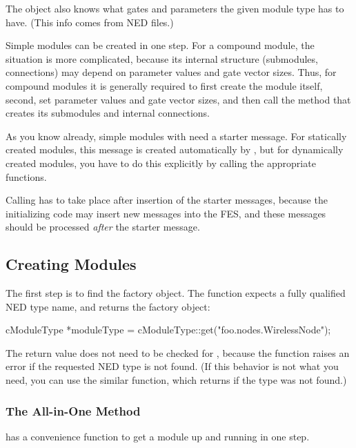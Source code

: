 The  object also knows what gates and
parameters the given module type has to have. (This info comes from
NED files.)

Simple modules can be created in one step. For a compound module, the
situation is more complicated, because its internal structure
(submodules, connections) may depend on parameter values and gate
vector sizes. Thus, for compound modules it is generally required to
first create the module itself, second, set parameter values and gate
vector sizes, and then call the method that creates its submodules and
internal connections.

As you know already, simple modules with  need a
starter message. For statically created
modules, this message is created automatically by {\opp}, but for
dynamically created modules, you have to do this explicitly by calling
the appropriate functions.

Calling  has to take place after insertion of the
starter messages, because the initializing code may insert new messages
into the FES, and these messages should be processed
\textit{after} the starter message.


\subsection{Creating Modules}
\label{sec:simple-modules:dynamic-creation:api}

The first step is to find the factory object. The 
function expects a fully qualified NED type name, and returns the factory
object:

\begin{cpp}
cModuleType *moduleType = cModuleType::get("foo.nodes.WirelessNode");
\end{cpp}

The return value does not need to be checked for , because
the function raises an error if the requested NED type is not found.
(If this behavior is not what you need, you can use the similar
 function, which returns  if the type
was not found.)

\subsubsection{The All-in-One Method}
\label{sec:simple-modules:dynamic:createscheduleinit}

 has a
convenience function to get a module up and running in one step.

